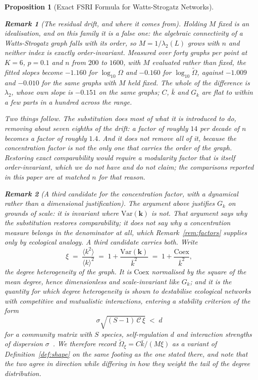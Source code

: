 \documentclass[11pt,a4paper]{article}
\newtheorem{proposition}{Proposition}
\newtheorem{remark}{Remark}
\begin{document}
\begin{proposition}[Exact FSRI Formula for Watts-Strogatz Networks]
\begin{remark}[The residual drift, and where it comes from]
\label{rem:residual_drift}
Holding $M$ fixed is an idealisation, and on this family it is a false one:
the algebraic connectivity of a Watts-Strogatz graph falls with its order, so
$M = 1/\lambda_2(L)$ grows with $n$ and neither index is exactly
order-invariant. Measured over forty graphs per point at $K=6$, $p=0.1$ and
$n$ from $200$ to $1600$, with $M$ evaluated rather than fixed, the fitted
slopes become $-1.160$ for $\log_{10}\Omega$ and $-0.160$ for
$\log_{10}\widetilde{\Omega}$, against $-1.009$ and $-0.010$ for the same
graphs with $M$ held fixed. The whole of the difference is $\lambda_2$, whose
own slope is $-0.151$ on the same graphs; $C$, $\bar{k}$ and $G_k$ are flat to
within a few parts in a hundred across the range.

Two things follow. The substitution does most of what it is introduced to do,
removing about seven eighths of the drift: a factor of roughly $14$ per decade
of $n$ becomes a factor of roughly $1.4$. And it does not remove all of it,
because the concentration factor is not the only one that carries the order of
the graph. Restoring exact comparability would require a modularity factor
that is itself order-invariant, which we do not have and do not claim; the
comparisons reported in this paper are at matched $n$ for that reason.
\end{remark}

\begin{remark}[A third candidate for the concentration factor, with a
dynamical rather than a dimensional justification]
\label{rem:xi}
The argument above justifies $G_k$ on grounds of scale: it is invariant where
$\mathrm{Var}(\mathbf{k})$ is not. That argument says why the substitution
restores comparability; it does not say why a concentration measure belongs in
the denominator at all, which Remark~\ref{rem:factors} supplies only by
ecological analogy. A third candidate carries both. Write
\begin{equation}
\xi \;=\; \frac{\langle k^2 \rangle}{\langle k \rangle^2}
\;=\; 1 + \frac{\mathrm{Var}(\mathbf{k})}{\bar{k}^2}
\;=\; 1 + \frac{\mathrm{Coex}}{\bar{k}^2},
\label{eq:xi}
\end{equation}
the degree heterogeneity of the graph. It is $\mathrm{Coex}$ normalised by the
square of the mean degree, hence dimensionless and scale-invariant like $G_k$;
and it is the quantity for which degree heterogeneity is shown to destabilise
ecological networks with competitive and mutualistic interactions, entering a
stability criterion of the form
\begin{equation}
\sigma \sqrt{(S-1)\,\mathcal{C}\,\xi} \;<\; d
\label{eq:yan}
\end{equation}
for a community matrix with $S$ species, self-regulation $d$ and interaction
strengths of dispersion $\sigma$~\cite{yan2017}. We therefore record
$\widetilde{\Omega}_\xi = C\bar{k}/(M\xi)$ as a variant of
Definition~\ref{def:shape} on the same footing as the one stated there, and
note that the two agree in direction while differing in how they weight the
tail of the degree distribution.


\end{remark}
\end{proposition}
\end{document}
